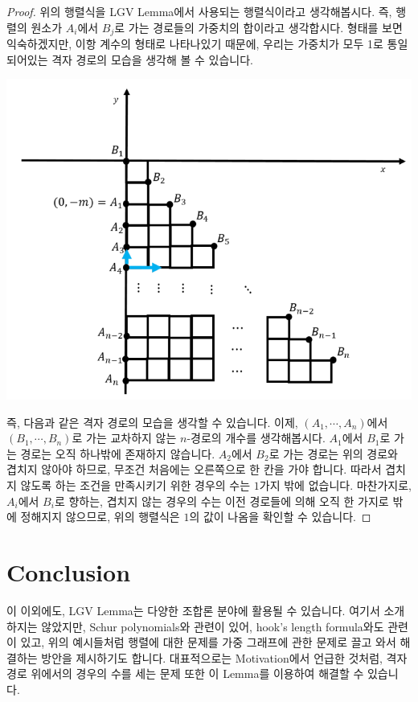 \documentclass[a4paper]{article}
\begin{document}
\begin{proof}
위의 행렬식을 LGV Lemma에서 사용되는 행렬식이라고 생각해봅시다. 즉, 행렬의 원소가 $A_i$에서 $B_j$로 가는 경로들의 가중치의 합이라고 생각합시다. 형태를 보면 익숙하겠지만, 이항 계수의 형태로 나타나있기 때문에, 우리는 가중치가 모두 1로 통일되어있는 격자 경로의 모습을 생각해 볼 수 있습니다.
\begin{center}
\includegraphics[scale=0.6]{image5.png}
\end{center}
즉, 다음과 같은 격자 경로의 모습을 생각할 수 있습니다. 이제, $(A_1, \cdots, A_n)$에서 $(B_1, \cdots, B_n)$로 가는 교차하지 않는 $n$-경로의 개수를 생각해봅시다. $A_1$에서 $B_1$로 가는 경로는 오직 하나밖에 존재하지 않습니다. $A_2$에서 $B_2$로 가는 경로는 위의 경로와 겹치지 않아야 하므로, 무조건 처음에는 오른쪽으로 한 칸을 가야 합니다. 따라서 겹치지 않도록 하는 조건을 만족시키기 위한 경우의 수는 $1$가지 밖에 없습니다. 마찬가지로, $A_i$에서 $B_i$로 향하는, 겹치지 않는 경우의 수는 이전 경로들에 의해 오직 한 가지로 밖에 정해지지 않으므로, 위의 행렬식은 $1$의 값이 나옴을 확인할 수 있습니다. 
\end{proof}

\section{Conclusion}
이 이외에도, LGV Lemma는 다양한 조합론 분야에 활용될 수 있습니다. 여기서 소개하지는 않았지만, Schur polynomials와 관련이 있어, hook's length formula와도 관련이 있고, 위의 예시들처럼 행렬에 대한 문제를 가중 그래프에 관한 문제로 끌고 와서 해결하는 방안을 제시하기도 합니다. 대표적으로는 Motivation에서 언급한 것처럼, 격자 경로 위에서의 경우의 수를 세는 문제 또한 이 Lemma를 이용하여 해결할 수 있습니다.\\
\end{document}

